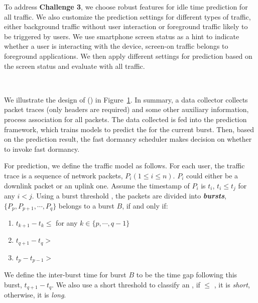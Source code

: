 To address {\bf Challenge 3}, we choose robust features for idle time prediction for all traffic. We also customize the prediction settings for different types of traffic, either background traffic without user interaction or foreground traffic likely to be triggered by users. We use smartphone screen status as a hint to indicate whether a user is interacting with the device, \ie screen-on traffic belongs to foreground applications. We then apply different settings for prediction based on the screen status and evaluate \NAME with all traffic.

\begin{figure}[t]
\centering
{} \\
\label{fig:flow}
\end{figure}

We illustrate the design of  \NAMEFULL (\NAME) in Figure~\ref{fig:flow}. In summary, a data collector collects packet traces (only headers are required) and some other auxiliary information, \eg process association for all packets. The data collected is fed into the \IBT prediction framework, which trains models to predict the \IBT for the current burst. Then, based on the prediction result, the fast dormancy scheduler makes decision on whether to invoke fast dormancy.

For \IBT prediction, we define the traffic model as follows. For each user, the traffic trace is a sequence of network packets, $P_{i} (1 \leq i \leq n)$. $P_{i}$ could either be a downlink packet or an uplink one. Assume the timestamp of $P_{i}$ is $t_{i}$, $t_{i} \leq t_{j}$ for any $i < j$. Using a burst threshold \BT, the packets are divided into \textbf{\em bursts}, \ie $\{P_{p}, P_{p+1}, \cdots, P_{q}\}$ belongs to a burst $B$, if and only if: 
\begin{enumerate}
\item $t_{k + 1} - t_{k} \leq$ \BT for any $k \in \{p, \cdots, q - 1\}$
\item $t_{q+1} - t_{q} > $ \BT 
\item $t_{p} - t_{p - 1} > $ \BT
\end{enumerate}
We define the inter-burst time \IBT for burst $B$ to be the time gap following this burst, \ie $t_{q+1} - t_{q}$. We also use a short \IBT threshold \SBT to classify an \IBT, \ie if \IBT $\leq$ \SBT, it is {\em short}, otherwise, it is {\em long}.

